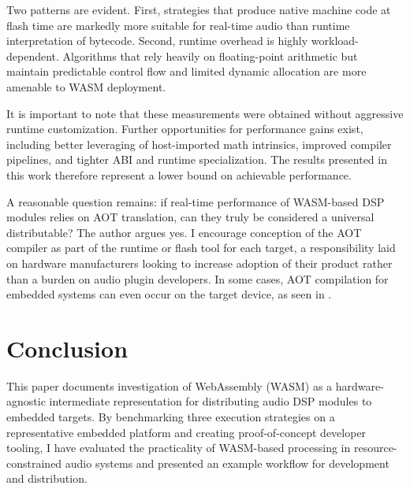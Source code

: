 \documentclass[a4paper]{article}
\begin{document}
Two patterns are evident. First, strategies that produce native machine code at flash time are markedly more suitable for real-time audio than runtime interpretation of bytecode. Second, runtime overhead is highly workload-dependent. Algorithms that rely heavily on floating-point arithmetic but maintain predictable control flow and limited dynamic allocation are more amenable to WASM deployment.

It is important to note that these measurements were obtained without aggressive runtime customization. Further opportunities for performance gains exist, including better leveraging of host-imported math intrinsics, improved compiler pipelines, and tighter ABI and runtime specialization. The results presented in this work therefore represent a lower bound on achievable performance.


A reasonable question remains: if real-time performance of WASM-based DSP modules relies on AOT translation, can they truly be considered a universal distributable? The author argues yes. I encourage conception of the AOT compiler as part of the runtime or flash tool for each target, a responsibility laid on hardware manufacturers looking to increase adoption of their product rather than a burden on audio plugin developers. In some cases, AOT compilation for embedded systems can even occur on the target device, as seen in \cite{10756513}.




\section{ Conclusion }

This paper documents investigation of WebAssembly (WASM) as a hardware-agnostic intermediate representation for distributing audio DSP modules to embedded targets. By benchmarking three execution strategies on a representative embedded platform and creating proof-of-concept developer tooling, I have evaluated the practicality of WASM-based processing in resource-constrained audio systems and presented an example workflow for development and distribution.
\end{document}
